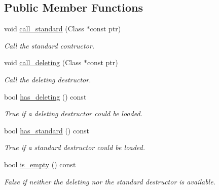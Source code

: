 \subsection*{Public Member Functions}
\begin{DoxyCompactItemize}
\item 
\mbox{\label{a01360_a95d55018849080c7d4c771b564e9b04e}} 
void \hyperlink{a01360_a95d55018849080c7d4c771b564e9b04e}{call\+\_\+standard} (Class $\ast$const ptr)
\begin{DoxyCompactList}\small\item\em Call the standard contructor. \end{DoxyCompactList}\item 
\mbox{\label{a01360_aabc107ff82b8a6f7e5aed5bd84080b1f}} 
void \hyperlink{a01360_aabc107ff82b8a6f7e5aed5bd84080b1f}{call\+\_\+deleting} (Class $\ast$const ptr)
\begin{DoxyCompactList}\small\item\em Call the deleting destructor. \end{DoxyCompactList}\item 
\mbox{\label{a01360_a2bb22835888e89f460dcba879c39f521}} 
bool \hyperlink{a01360_a2bb22835888e89f460dcba879c39f521}{has\+\_\+deleting} () const
\begin{DoxyCompactList}\small\item\em True if a deleting destructor could be loaded. \end{DoxyCompactList}\item 
\mbox{\label{a01360_aa7aeeca366db1520388239dc470c9509}} 
bool \hyperlink{a01360_aa7aeeca366db1520388239dc470c9509}{has\+\_\+standard} () const
\begin{DoxyCompactList}\small\item\em True if a standard destructor could be loaded. \end{DoxyCompactList}\item 
\mbox{\label{a01360_a11c37bcf56ad6f904376fbaf86acc2ce}} 
bool \hyperlink{a01360_a11c37bcf56ad6f904376fbaf86acc2ce}{is\+\_\+empty} () const
\begin{DoxyCompactList}\small\item\em False if neither the deleting nor the standard destructor is available. \end{DoxyCompactList}\item 

\end{DoxyCompactItemize}
